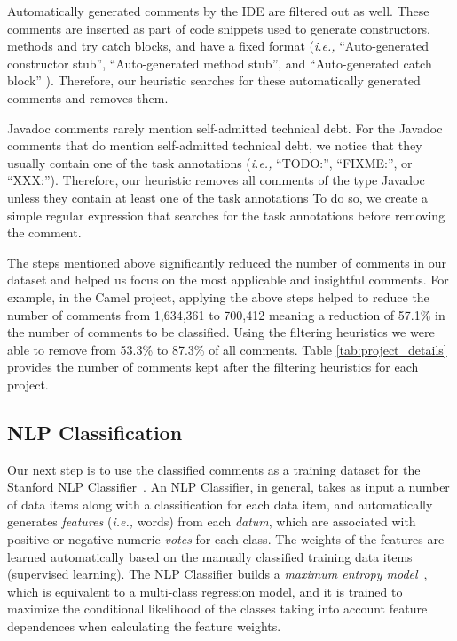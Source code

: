 Automatically generated comments by the IDE are filtered out as well. These comments are inserted as part of code snippets used to generate constructors, methods and try catch blocks, and have a fixed format (\textit{i.e.,} ``Auto-generated constructor stub'', ``Auto-generated method stub'', and ``Auto-generated catch block'' ). Therefore, our heuristic searches for these automatically generated comments and removes them. 

Javadoc comments rarely mention self-admitted technical debt. For the Javadoc comments that do mention self-admitted technical debt, we notice that they usually contain one of the task annotations (\textit{i.e.,} ``TODO:'', ``FIXME:'', or ``XXX:''). Therefore, our heuristic removes all comments of the type Javadoc unless they contain at least one of the task annotations  To do so, we create a simple regular expression that searches for the task annotations before removing the comment.  

The steps mentioned above significantly reduced the number of comments in our dataset and helped us focus on the most applicable and insightful comments. For example, in the Camel project, applying the above steps helped to reduce the number of comments from 1,634,361 to 700,412 meaning a reduction of 57.1\% in the number of comments to be classified.  Using the filtering heuristics we were able to remove from 53.3\% to 87.3\% of all comments. Table \ref{tab:project_details} provides the number of comments kept after the filtering heuristics for each project.


\subsection{NLP Classification}
\label{sub:nlp_classification}

Our next step is to use the classified \SATD comments as a training dataset for the Stanford NLP Classifier~\cite{Manning2014ACL}.
An NLP Classifier, in general, takes as input a number of data items along with a classification for each data item, and automatically generates \textit{features} (\textit{i.e.,} words) from each \textit{datum}, which are associated with positive or negative numeric \textit{votes} for each class. The weights of the features are learned automatically based on the manually classified training data items (supervised learning). The NLP Classifier builds a \textit{maximum entropy model}~, which is equivalent to a multi-class regression model, and it is trained to maximize the conditional likelihood of the classes taking into account feature dependences when calculating the feature weights.

